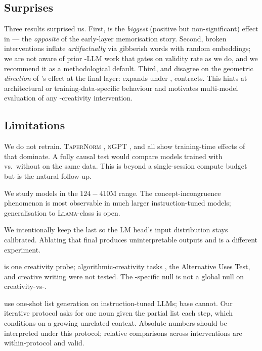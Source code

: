 \subsection{Surprises}

Three results surprised us.
First, \tgtlate \nomean is the \emph{biggest} (positive but
non-significant) effect in \gptsmall \topp --- the \emph{opposite} of the
\citet{singhal2025impact} early-layer memorisation story. Second,
broken interventions inflate \dat \emph{artifactually} via gibberish words
with random embeddings; we are not aware of prior \dat-LLM work that gates
on validity rate as we do, and we recommend it as a methodological
default. Third, \pythia and \gptsmall disagree on the geometric
\emph{direction} of \layernorm's effect at the final layer: \pythia
expands under \nomean, \gptsmall contracts. This hints at architectural
or training-data-specific behaviour and motivates multi-model evaluation
of any \layernorm-creativity intervention.

\subsection{Limitations}

We do not retrain. \textsc{TaperNorm} \citep{kanavalau2026taper}, \textsc{nGPT}
\citep{loshchilov2025ngpt}, and \citet{singhal2025impact} all show
training-time effects of \layernorm that dominate. A fully causal test
would compare models trained with vs.\ without \layernorm on the same
data. This is beyond a single-session compute budget but is the natural
follow-up.

We study models in the $124\!-\!410$M range. The concept-incongruence
phenomenon is most observable in much larger instruction-tuned models;
generalisation to \textsc{Llama}-class is open.

We intentionally keep the last \layernorm so the LM head's input
distribution stays calibrated. Ablating that final \layernorm produces
uninterpretable outputs and is a different experiment.

\dat is one creativity probe; algorithmic-creativity tasks
\citep{nagarajan2025roll}, the Alternative Uses Test, and creative writing
were not tested. The \dat-specific null is not a global null on
creativity-vs-\layernorm.

\citet{chen2023probing} use one-shot list generation on
instruction-tuned LLMs; base \gptsmall cannot. Our iterative protocol asks
for one noun given the partial list each step, which conditions on a
growing unrelated context. Absolute \dat numbers should be interpreted
under this protocol; relative comparisons across interventions are
within-protocol and valid.

